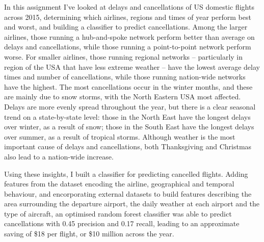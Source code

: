 \documentclass[a4paper]{article}
\begin{document}
In this assignment I've looked at delays and cancellations of US domestic flights across 2015, determining which airlines, regions and times of year perform best and worst, and building a classifier to predict cancellations. Among the larger airlines, those running a hub-and-spoke network perform better than average on delays and cancellations, while those running a point-to-point network perform worse. For smaller airlines, those running regional networks -- particularly in region of the USA that have less extreme weather -- have the lowest average delay times and number of cancellations, while those running nation-wide networks have the highest. The most cancellations occur in the winter months, and these are mainly due to snow storms, with the North Eastern USA most affected. Delays are more evenly spread throughout the year, but there is a clear seasonal trend on a state-by-state level: those in the North East have the longest delays over winter, as a result of snow; those in the South East have the longest delays over summer, as a result of tropical storms. Although weather is the most important cause of delays and cancellations, both Thanksgiving and Christmas also lead to a nation-wide increase.

Using these insights, I built a classifier for predicting cancelled flights. Adding features from the dataset encoding the airline, geographical and temporal behaviour, and encorporating external datasets to build features describing the area surrounding the departure airport, the daily weather at each airport and the type of aircraft, an optimised random forest classifier was able to predict cancellations with 0.45 precision and 0.17 recall, leading to an approximate saving of \$18 per flight, or \$10 million across the year.
\end{document}
